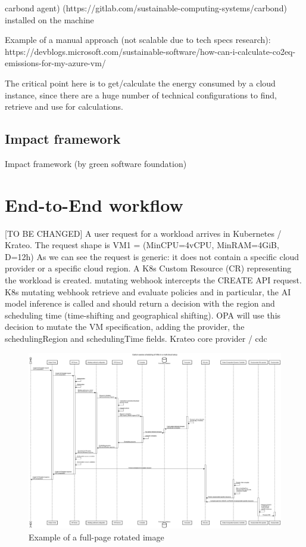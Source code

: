 carbond agent) (https://gitlab.com/sustainable-computing-systems/carbond)
installed on the machine


Example of a manual approach (not scalable due to tech specs research): https://devblogs.microsoft.com/sustainable-software/how-can-i-calculate-co2eq-emissions-for-my-azure-vm/ 

The critical point here is to get/calculate the energy consumed by a cloud instance, since there are a huge number of technical configurations to find, retrieve and use for calculations.



\subsection{Impact framework}

Impact framework (by green software foundation)

\section{End-to-End workflow}
\label{sec:e2eflow}

[TO BE CHANGED]
A user request for a workload arrives in Kubernetes / Krateo. 
The request shape is VM1 = (MinCPU=4vCPU, MinRAM=4GiB, D=12h)
As we can see the request is generic: it does not contain a specific cloud provider or a specific cloud region.
A K8s Custom Resource (CR) representing the workload is created.
mutating webhook intercepts the CREATE API request.
K8s mutating webhook retrieve and evaluate policies and in particular, the AI model inference is called and should return a decision with the region and scheduling time (time-shifting and geographical shifting).
OPA will use this decision to mutate the VM specification, adding the provider, the schedulingRegion and schedulingTime fields.
Krateo core provider / cdc


\begin{figure}
  \centering
  \includegraphics[width=\textheight]{images/sequence_diagram.png}
  \caption{Example of a full-page rotated image}
  \label{fig:rotated_image}
\end{figure}



